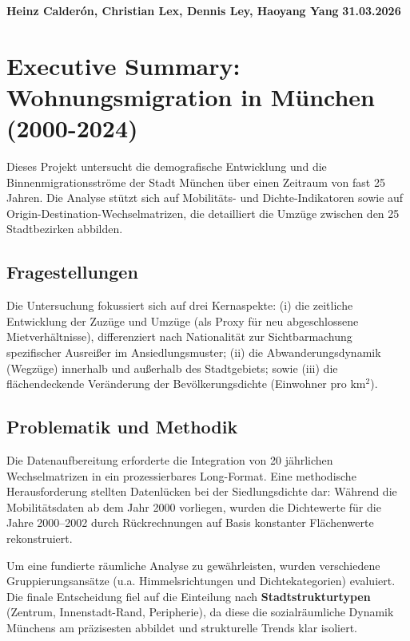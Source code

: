 \documentclass[11pt,a4paper]{article}
\begin{document}
\noindent\textbf{Heinz Calderón, Christian Lex, Dennis Ley, Haoyang Yang} \hfill \textbf{31.03.2026}

\vspace{1em} %

\section*{Executive Summary: Wohnungsmigration in München (2000-2024)}

Dieses Projekt untersucht die demografische Entwicklung und die Binnenmigrationsströme der Stadt München über einen Zeitraum von fast 25 Jahren. Die Analyse stützt sich auf Mobilitäts- und Dichte-Indikatoren sowie auf Origin-Destination-Wechselmatrizen, die detailliert die Umzüge zwischen den 25 Stadtbezirken abbilden.

\subsection*{Fragestellungen}
Die Untersuchung fokussiert sich auf drei Kernaspekte: (i) die zeitliche Entwicklung der Zuzüge und Umzüge (als Proxy für neu abgeschlossene Mietverhältnisse), differenziert nach Nationalität zur Sichtbarmachung spezifischer Ausreißer im Ansiedlungsmuster; (ii) die Abwanderungsdynamik (Wegzüge) innerhalb und außerhalb des Stadtgebiets; sowie (iii) die flächendeckende Veränderung der Bevölkerungsdichte (Einwohner pro km$^2$).

\subsection*{Problematik und Methodik}
Die Datenaufbereitung erforderte die Integration von 20 jährlichen Wechselmatrizen in ein prozessierbares Long-Format. Eine methodische Herausforderung stellten Datenlücken bei der Siedlungsdichte dar: Während die Mobilitätsdaten ab dem Jahr 2000 vorliegen, wurden die Dichtewerte für die Jahre 2000–2002 durch Rückrechnungen auf Basis konstanter Flächenwerte rekonstruiert.

Um eine fundierte räumliche Analyse zu gewährleisten, wurden verschiedene Gruppierungsansätze (u.a. Himmelsrichtungen und Dichtekategorien) evaluiert. Die finale Entscheidung fiel auf die Einteilung nach \textbf{Stadtstrukturtypen} (Zentrum, Innenstadt-Rand, Peripherie), da diese die sozialräumliche Dynamik Münchens am präzisesten abbildet und strukturelle Trends klar isoliert.
\end{document}

